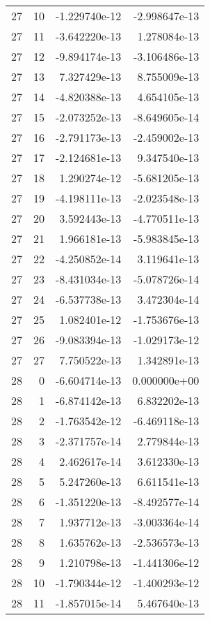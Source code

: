 \begin{tabular}{rrrr}
  27 &   10 & -1.229740e-12 & -2.998647e-13 \\
  27 &   11 & -3.642220e-13 &  1.278084e-13 \\
  27 &   12 & -9.894174e-13 & -3.106486e-13 \\
  27 &   13 &  7.327429e-13 &  8.755009e-13 \\
  27 &   14 & -4.820388e-13 &  4.654105e-13 \\
  27 &   15 & -2.073252e-13 & -8.649605e-14 \\
  27 &   16 & -2.791173e-13 & -2.459002e-13 \\
  27 &   17 & -2.124681e-13 &  9.347540e-13 \\
  27 &   18 &  1.290274e-12 & -5.681205e-13 \\
  27 &   19 & -4.198111e-13 & -2.023548e-13 \\
  27 &   20 &  3.592443e-13 & -4.770511e-13 \\
  27 &   21 &  1.966181e-13 & -5.983845e-13 \\
  27 &   22 & -4.250852e-14 &  3.119641e-13 \\
  27 &   23 & -8.431034e-13 & -5.078726e-14 \\
  27 &   24 & -6.537738e-13 &  3.472304e-14 \\
  27 &   25 &  1.082401e-12 & -1.753676e-13 \\
  27 &   26 & -9.083394e-13 & -1.029173e-12 \\
  27 &   27 &  7.750522e-13 &  1.342891e-13 \\
  28 &    0 & -6.604714e-13 &  0.000000e+00 \\
  28 &    1 & -6.874142e-13 &  6.832202e-13 \\
  28 &    2 & -1.763542e-12 & -6.469118e-13 \\
  28 &    3 & -2.371757e-14 &  2.779844e-13 \\
  28 &    4 &  2.462617e-14 &  3.612330e-13 \\
  28 &    5 &  5.247260e-13 &  6.611541e-13 \\
  28 &    6 & -1.351220e-13 & -8.492577e-14 \\
  28 &    7 &  1.937712e-13 & -3.003364e-14 \\
  28 &    8 &  1.635762e-13 & -2.536573e-13 \\
  28 &    9 &  1.210798e-13 & -1.441306e-12 \\
  28 &   10 & -1.790344e-12 & -1.400293e-12 \\
  28 &   11 & -1.857015e-14 &  5.467640e-13 \\

\end{tabular}
